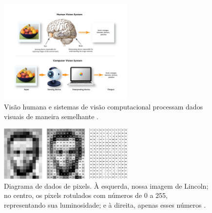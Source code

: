 \begin{figure}[!ht]
	\centering
	\includegraphics[width=0.6\textwidth]{figures/content_Human_Vision.png}
	\caption{Visão humana e sistemas de visão computacional processam dados visuais de maneira semelhante \cite{content_Human_Vision}.}
	\label{fig:comp_vision}
\end{figure}	

\begin{figure}[!ht]
	\centering
	\includegraphics[width=0.6\textwidth]{figures/lincoln_pixel_values.png}
	\caption{Diagrama de dados de pixels. À esquerda, nossa imagem de Lincoln; no centro, os pixels rotulados com números de 0 a 255, representando sua luminosidade; e à direita, apenas esses números \cite{content_Human_Vision}.}
	\label{fig:comp_vision}
\end{figure}


